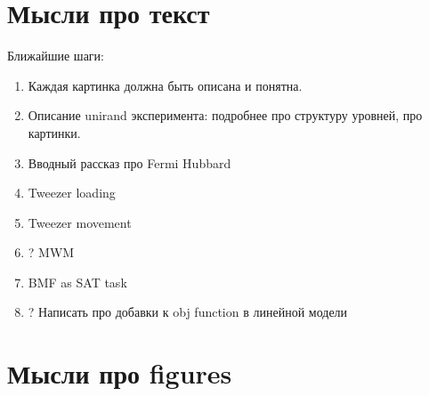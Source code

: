 

\section*{Мысли про текст}

Ближайшие шаги:
\begin{enumerate}
	\item Каждая картинка должна быть описана и понятна. 
	\item Описание unirand эксперимента: подробнее про структуру уровней, про картинки.
	\item Вводный рассказ про Fermi Hubbard
	\item Tweezer loading
	\item Tweezer movement
	\item ? MWM
	\item BMF as SAT task
	\item ? Написать про добавки к obj function в линейной модели
	
	



\end{enumerate}



\section*{Мысли про figures}


